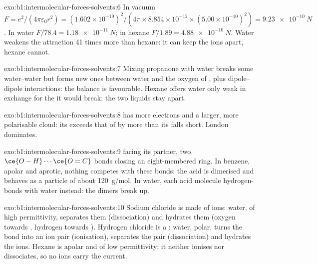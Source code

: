 \begin{solution}{exo:b1:intermolecular-forces-solvents:6}
In vacuum $F = e^2/(4\pi\varepsilon_0 r^2) = (1.602 \times
10^{-19})^2/(4\pi \times 8.854 \times 10^{-12} \times (5.00 \times
10^{-10})^2) = \qty{9.23e-10}{N}$. In water $F/78.4 = \qty{1.18e-11}{N}$;
in hexane $F/1.89 = \qty{4.88e-10}{N}$. Water weakens the attraction 41
times more than hexane: it can keep the ions apart, hexane cannot.
\end{solution}

\begin{solution}{exo:b1:intermolecular-forces-solvents:7}
Mixing propanone with water breaks some water--water  but
forms new ones between water and the oxygen of , plus
dipole--dipole interactions: the balance is favourable. Hexane offers
water only weak  in exchange for the  it
would break: the two liquids stay apart.
\end{solution}

\begin{solution}{exo:b1:intermolecular-forces-solvents:8}
 has more electrons and a larger, more polarisable cloud: its
 exceeds that of  by more than its  falls short. London dominates.
\end{solution}

\begin{solution}{exo:b1:intermolecular-forces-solvents:9}
 facing its partner, two
$\ce{O-H}\cdots\ce{O=C}$ bonds closing an eight-membered ring. In benzene,
apolar and aprotic, nothing competes with these bonds: the acid is
dimerised and behaves as a particle of about \qty{120}{g/mol}. In water,
each acid molecule hydrogen-bonds with water instead: the dimers break up.
\end{solution}

\begin{solution}{exo:b1:intermolecular-forces-solvents:10}
Sodium chloride is made of ions: water, of high permittivity, separates
them (dissociation) and hydrates them (oxygen towards , hydrogen
towards ). Hydrogen chloride is a : water, polar,
turns the  bond into an ion pair  (ionisation),
separates the pair (dissociation) and hydrates the ions. Hexane is apolar
and of low permittivity: it neither ionises nor dissociates, so no ions
carry the current.
\end{solution}

